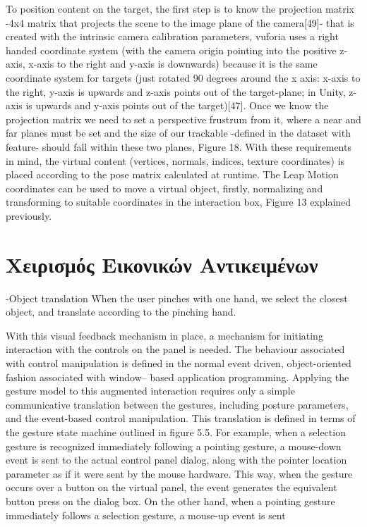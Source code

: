 To position content on the target, the first step is to know the projection matrix -4x4 matrix that projects the scene to the image plane of the camera[49]- that is created with the intrinsic camera calibration parameters, vuforia uses a right handed coordinate system (with the camera origin pointing into the positive z-axis, x-axis to the right and y-axis is downwards) because it is the same coordinate system for targets (just rotated 90 degrees around the x axis: x-axis to the right, y-axis is upwards and z-axis points out of the target-plane; in Unity, z-axis is upwards and y-axis points out of the target)[47]. Once we know the projection matrix we need to set a perspective frustrum from it, where a near and far planes must be set and the size of our trackable -defined in the dataset with feature- should fall within these two planes, Figure 18.
With these requirements in mind, the virtual content (vertices, normals, indices, texture coordinates)
is placed according to the pose matrix calculated at runtime.
The Leap Motion coordinates can be used to move a virtual object, firstly, normalizing and
transforming to suitable coordinates in the interaction box, Figure 13 explained previously.

\section{Χειρισμός Εικονικών Αντικειμένων} \label{s:manipulation}

-Object translation 
When the user pinches with one hand,
we select the closest object, and translate according to the
pinching hand.


With this visual feedback mechanism in place, a mechanism for initiating interaction with the controls on the panel is needed. The behaviour associated with control manipulation is defined in the normal event driven, object-oriented fashion associated with window– based application programming. Applying the gesture model to this augmented interaction requires only a simple communicative translation between the gestures, including posture parameters, and the event-based control manipulation. This translation is defined in terms of the gesture state machine outlined in figure 5.5. For example, when a selection gesture is recognized immediately following a pointing gesture, a mouse-down event is sent to the actual control panel dialog, along with the pointer location parameter as if it were sent by the mouse hardware. This way, when the gesture occurs over a button on the virtual panel, the event generates the equivalent button press on the dialog box. On the other hand, when a pointing gesture immediately follows a selection gesture, a mouse-up event is sent


